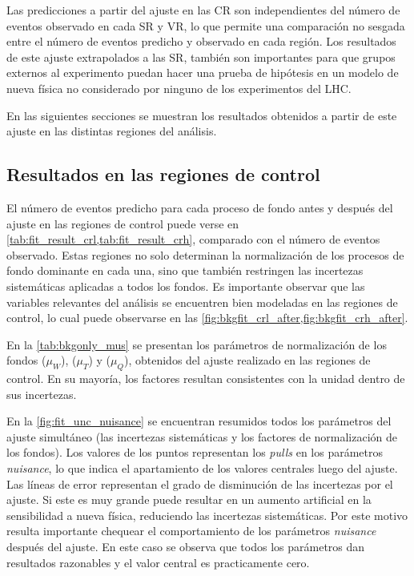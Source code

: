 Las predicciones a partir del ajuste en las CR son independientes del número de
eventos observado en cada SR y VR, lo que permite una comparación no sesgada
entre el número de eventos predicho y observado en cada región. Los resultados
de este ajuste extrapolados a las SR, también son importantes para que grupos
externos al experimento puedan hacer una prueba de hipótesis en un modelo de
nueva física no considerado por ninguno de los experimentos del LHC.

En las siguientes secciones se muestran los resultados obtenidos a partir
de este ajuste en las distintas regiones del análisis.


\subsection{Resultados en las regiones de control}

El número de eventos predicho para cada proceso de fondo antes y después del ajuste en
las regiones de control puede verse en \cref{tab:fit_result_crl,tab:fit_result_crh},
comparado con el número de eventos observado.
Estas regiones no solo determinan la normalización de los procesos de fondo dominante
en cada una, sino que también restringen las incertezas sistemáticas aplicadas a todos
los fondos. Es importante observar que las variables relevantes del análisis se encuentren
bien modeladas en las regiones de control, lo cual puede observarse en las \cref{fig:bkgfit_crl_after,fig:bkgfit_crh_after}.

En la \cref{tab:bkgonly_mus} se presentan los parámetros de normalización de
los fondos {\wgam} ($\mu_W$), {\ttgam} ($\mu_T$) y {\gjet}
($\mu_Q$), obtenidos del ajuste realizado en las regiones de control.
En su mayoría, los factores resultan consistentes con la unidad dentro de sus incertezas.

En la \cref{fig:fit_unc_nuisance} se encuentran resumidos todos los parámetros
del ajuste simultáneo (las incertezas sistemáticas y los factores de
normalización de los fondos). Los valores de los puntos representan los
\emph{pulls} en los parámetros \emph{nuisance}, lo que indica el apartamiento de los valores
centrales luego del ajuste. Las líneas de error representan el
 grado de disminución de las incertezas por el
ajuste. Si este es muy grande puede resultar en un aumento artificial
en la sensibilidad a nueva física, reduciendo las incertezas sistemáticas.
Por este motivo resulta importante
chequear el comportamiento de los parámetros \emph{nuisance} después del ajuste.
En este caso se observa que todos los parámetros dan resultados razonables
y el valor central es practicamente cero.


